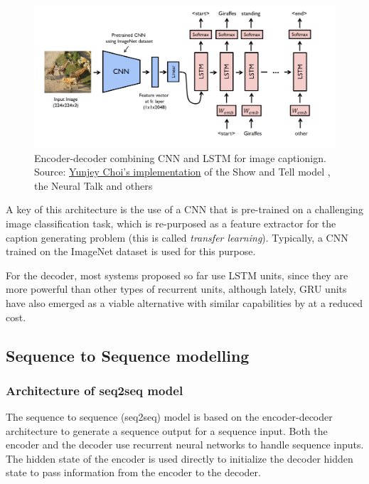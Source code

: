 \begin{figure}[hpt]
	\centering
	\includegraphics[scale=0.3]{images/ch3/cnn-rnn.png}
	\caption{Encoder-decoder combining CNN and LSTM for image captionign. Source:  \href{https://github.com/yunjey/pytorch-tutorial/tree/master/tutorials/03-advanced/image_captioning}{Yunjey Choi's implementation} of the Show and Tell model \citep{Vinyals2015}, the Neural Talk and others}
	\label{fig:cnn-rnn}
\end{figure}

A key of this architecture is the use of a CNN that is pre-trained on a challenging image classification task, which is re-purposed as a feature extractor for the caption generating problem (this is called \textit{transfer learning}). Typically, a CNN trained on the ImageNet dataset is used for this purpose.

For the decoder, most systems proposed so far use LSTM units, since they are more powerful than other types of recurrent units, although lately, GRU units have also emerged as a viable alternative with similar capabilities by at a reduced cost.

\subsection{Sequence to Sequence modelling}\label{subsec:seq2seq}

\subsubsection{Architecture of seq2seq model}

The sequence to sequence (seq2seq) model is based on the encoder-decoder architecture to generate a sequence output for a sequence input. Both the encoder and the decoder use recurrent neural networks to handle sequence inputs. The hidden state of the encoder is used directly to initialize the decoder hidden state to pass information from the encoder to the decoder.

